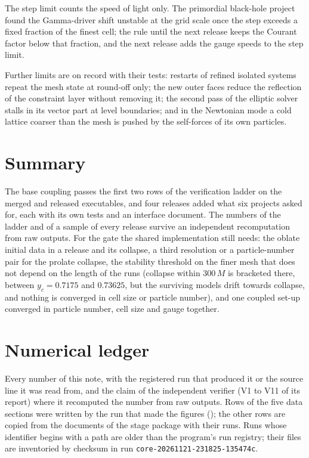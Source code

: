 \documentclass[aps,prd,twocolumn,superscriptaddress,nofootinbib,floatfix]{revtex4-2}
\begin{document}
The step limit counts the speed of light only. The primordial
black-hole project found the Gamma-driver shift unstable at the grid scale once the step
exceeds a fixed fraction of the finest cell; the rule until the next release keeps the
Courant factor below that fraction, and the next release adds the gauge speeds to the
step limit.

Further limits are on record with their tests: restarts of refined isolated systems
repeat the mesh state at round-off only; the new outer faces reduce the reflection of
the constraint layer without removing it; the second pass of the elliptic solver stalls
in its vector part at level boundaries; and in the Newtonian mode a cold lattice coarser
than the mesh is pushed by the self-forces of its own particles.

\section{Summary}

The base coupling passes the first two rows of the verification ladder on the merged and
released executables, and four releases added what six projects asked for, each with its
own tests and an interface document. The numbers of the ladder and of a sample of every
release survive an independent recomputation from raw outputs. For the gate the shared
implementation still needs: the oblate initial data in a release and its collapse, a
third resolution or a particle-number pair for the prolate collapse, the stability
threshold on the finer mesh that does not depend on the length of the runs (collapse
within $300\,M$ is bracketed there, between $y_c=0.7175$ and $0.73625$, but the surviving
models drift towards collapse, and nothing is converged in cell size or particle number),
and one coupled set-up converged
in particle number, cell size and gauge together.

\appendix

\onecolumngrid
\section{Numerical ledger}\label{app:ledger}

Every number of this note, with the registered run that produced it or the source line
it was read from, and the claim of the independent verifier (V1 to V11 of its report)
where it recomputed the number from raw outputs. Rows of the five data sections were
written by the run that made the figures (\noterun); the other rows are copied from the
documents of the stage package with their runs. Runs whose identifier begins with a path
are older than the program's run registry; their files are inventoried by checksum in
run \texttt{core-20261121-231825-135474c}.

{\small

}

\twocolumngrid

\end{document}
